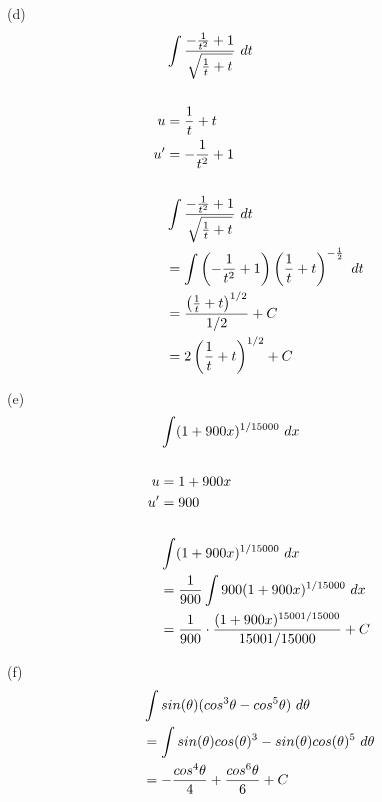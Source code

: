 \begin{exercise}
    (d)
    \begin{align}
           & \int {-{1 \over t^2} + 1 \over \sqrt{{1 \over t} + t}} \ dt                            \\
        \\
        u  & = {1 \over t} + t                                                                      \\
        u' & = -{1 \over t^2} + 1                                                                   \\
        \\
           & \int {-{1 \over t^2} + 1 \over \sqrt{{1 \over t} + t}} \ dt                            \\
           & = \int \left(-{1 \over t^2} + 1\right)\left({1 \over t} + t\right)^{-{1 \over 2}} \ dt \\
           & = {\left({1 \over t} +t\right)^{1/2} \over 1/2} + C                                    \\
           & = 2\left({1 \over t} + t\right)^{1/2} + C                                              \\
    \end{align}

    (e)
    \begin{align}
           & \int (1 + 900x)^{1/15000} \ dx                                       \\
        \\
        u  & = 1 + 900x                                                           \\
        u' & = 900                                                                \\
        \\
           & \int (1 + 900x)^{1/15000} \ dx                                       \\
           & = {1 \over 900} \int 900(1 + 900x)^{1/15000} \ dx                    \\
           & = {1 \over 900} \cdot {(1+900x)^{15001/15000} \over 15001/15000} + C \\
    \end{align}

    (f)
    \begin{align}
         & \int sin(\theta)(cos^3\theta - cos^5\theta) \ d\theta                \\
         & = \int sin(\theta)cos(\theta)^3 - sin(\theta)cos(\theta)^5 \ d\theta \\
         & = -{cos^4\theta \over 4} + {cos^6\theta \over 6} + C                 \\
    \end{align}


\end{exercise}
